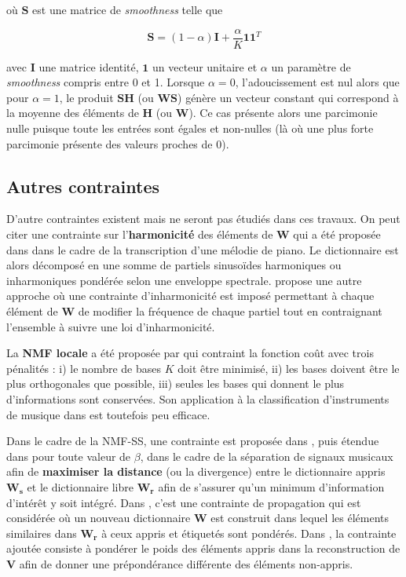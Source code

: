 où $\mathbf{S}$ est une matrice de \textit{smoothness} telle que

\begin{equation}
\mathbf{S} = (1-\alpha)\mathbf{I}+\frac{\alpha}{K}\mathbf{11}^T
\end{equation}

avec $\mathbf{I}$ une matrice identité, $\mathbf{1}$ un vecteur unitaire et $\alpha$ un paramètre de \textit{smoothness} compris entre 0 et 1. Lorsque $\alpha = 0$, l'adoucissement est nul alors que pour $\alpha = 1$, le produit $\mathbf{SH}$ (ou $\mathbf{WS}$) génère un vecteur constant qui correspond à la moyenne des éléments de $\mathbf{H}$ (ou $\mathbf{W}$). Ce cas présente alors une parcimonie nulle puisque toute les entrées sont égales et non-nulles (là où une plus forte parcimonie présente des valeurs proches de 0).

\subsection{Autres contraintes}

D'autre contraintes existent mais ne seront pas étudiés dans ces travaux.
On peut citer une contrainte sur l'\textbf{harmonicité} des éléments de $\mathbf{W}$ qui a été proposée dans \cite{vincent2008harmonic} dans le cadre de la transcription d'une mélodie de piano. Le dictionnaire est alors décomposé en une somme de partiels sinusoïdes harmoniques ou inharmoniques pondérée selon une enveloppe spectrale. \cite{rigaud2012piano} propose une autre approche où une contrainte d'inharmonicité est imposé permettant à chaque élément de $\mathbf{W}$ de modifier la fréquence de chaque partiel tout en contraignant l'ensemble à suivre une loi d'inharmonicité.

La \textbf{NMF locale} a été proposée par \cite{li2001learning} qui contraint la fonction coût avec trois pénalités : i) le nombre de bases $K$ doit être minimisé, ii) les bases doivent être le plus orthogonales que possible, iii) seules les bases qui donnent le plus d'informations sont conservées. Son application à la classification d'instruments de musique dans \cite{benetos2006musical} est toutefois peu efficace.

Dans le cadre de la NMF-SS, une contrainte est proposée dans \cite{yagi2012music}, puis étendue dans \cite{kitamura2014music} pour toute valeur de $\beta$, dans le cadre de la séparation de signaux musicaux afin de \textbf{maximiser la distance} (ou la divergence) entre le dictionnaire appris $\mathbf{W_s}$ et le dictionnaire libre $\mathbf{W_r}$ afin de s'assurer qu'un minimum d'information d'intérêt y soit intégré. Dans \cite{wang2016semi}, c'est une contrainte de propagation qui est considérée où un nouveau dictionnaire $\mathbf{W}$ est construit dans lequel les éléments similaires dans $\mathbf{W_r}$ à ceux appris et étiquetés sont pondérés. Dans \cite{lefevre2012semi}, la contrainte ajoutée consiste à pondérer le poids des éléments appris dans la reconstruction de $\mathbf{V}$ afin de donner une prépondérance différente des éléments non-appris.

